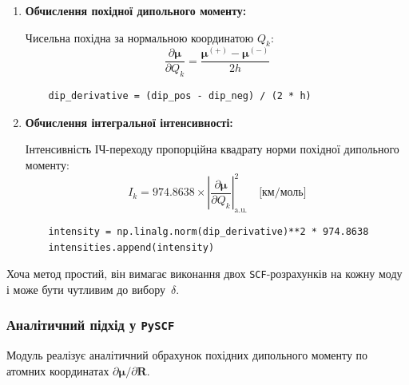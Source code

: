 \begin{enumerate}
          \begin{verbatim}
    mf_pos = scf.RHF(mol_pos); mf_pos.kernel()
    dip_pos = mf_pos.dip_moment(unit='Bohr')

    mf_neg = scf.RHF(mol_neg); mf_neg.kernel()
    dip_neg = mf_neg.dip_moment(unit='Bohr')
    \end{verbatim}

    \item \textbf{Обчислення похідної дипольного моменту:}

          Чисельна похідна за нормальною координатою $Q_k$:
          \begin{equation}
              \frac{\partial \boldsymbol{\mu}}{\partial Q_k} = \frac{\boldsymbol{\mu}^{(+)} - \boldsymbol{\mu}^{(-)}}{2h}
          \end{equation}

          \begin{verbatim}
    dip_derivative = (dip_pos - dip_neg) / (2 * h)
    \end{verbatim}

    \item \textbf{Обчислення інтегральної інтенсивності:}

          Інтенсивність ІЧ-переходу пропорційна квадрату норми похідної дипольного моменту:
          \begin{equation}
              I_k = 974.8638 \times \left|\frac{\partial \boldsymbol{\mu}}{\partial Q_k}\right|^2_{\text{a.u.}}
              \quad \text{[км/моль]}
          \end{equation}

          \begin{verbatim}
    intensity = np.linalg.norm(dip_derivative)**2 * 974.8638
    intensities.append(intensity)
    \end{verbatim}
\end{enumerate}



Хоча метод простий, він вимагає виконання двох \texttt{SCF}-розрахунків на кожну моду
і може бути чутливим до вибору~$\delta$.

\subsubsection{Аналітичний підхід у \texttt{PySCF}}
Модуль  реалізує аналітичний обрахунок похідних
дипольного моменту по атомних координатах $\partial\boldsymbol{\mu}/\partial \mathbf{R}$.

